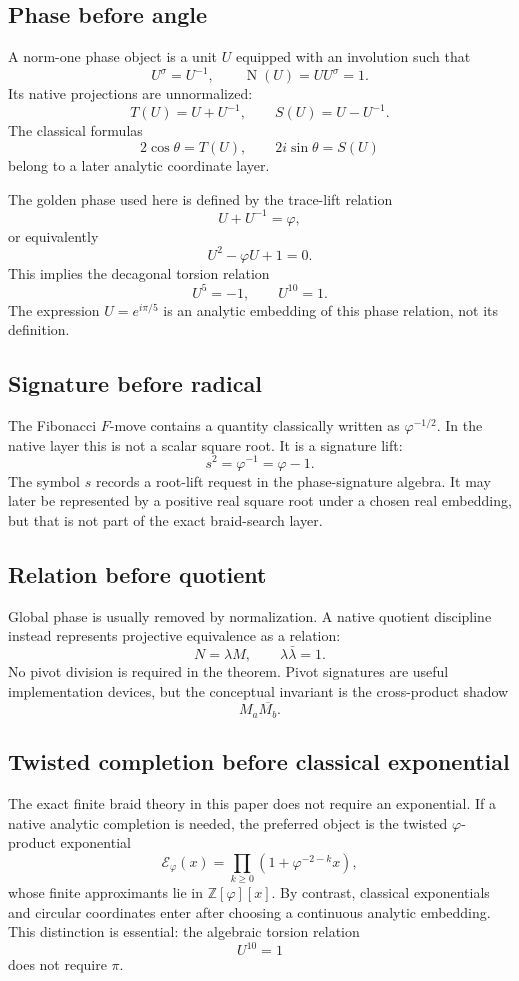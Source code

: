 \documentclass[11pt]{article}
\newcommand{\ph}{\varphi}
\newcommand{\Z}{\mathbb Z}
\newcommand{\Nm}{\operatorname{N}}
\newcommand{\sig}{\sigma}
\newcommand{\Etw}{\mathcal E_{\ph}}
\begin{document}
\subsection{Phase before angle}

A norm-one phase object is a unit $U$ equipped with an involution such that
\[
    U^\sig=U^{-1},
    \qquad
    \Nm(U)=UU^\sig=1.
\]
Its native projections are unnormalized:
\[
    T(U)=U+U^{-1},
    \qquad
    S(U)=U-U^{-1}.
\]
The classical formulas
\[
    2\cos\theta=T(U),
    \qquad
    2i\sin\theta=S(U)
\]
belong to a later analytic coordinate layer.

The golden phase used here is defined by the trace-lift relation
\[
    U+U^{-1}=\ph,
\]
or equivalently
\[
    U^2-\ph U+1=0.
\]
This implies the decagonal torsion relation
\[
    U^5=-1,\qquad U^{10}=1.
\]
The expression $U=e^{i\pi/5}$ is an analytic embedding of this phase relation, not its definition.

\subsection{Signature before radical}

The Fibonacci $F$-move contains a quantity classically written as $\ph^{-1/2}$.  In the native layer this is not a scalar square root.  It is a signature lift:
\[
    s^2=\ph^{-1}=\ph-1.
\]
The symbol $s$ records a root-lift request in the phase-signature algebra.  It may later be represented by a positive real square root under a chosen real embedding, but that is not part of the exact braid-search layer.

\subsection{Relation before quotient}

Global phase is usually removed by normalization.  A native quotient discipline instead represents projective equivalence as a relation:
\[
    N=\lambda M,
    \qquad
    \lambda\bar\lambda=1.
\]
No pivot division is required in the theorem.  Pivot signatures are useful implementation devices, but the conceptual invariant is the cross-product shadow
\[
    M_a\overline{M_b}.
\]

\subsection{Twisted completion before classical exponential}

The exact finite braid theory in this paper does not require an exponential.  If a native analytic completion is needed, the preferred object is the twisted $\ph$-product exponential
\[
    \Etw(x)=\prod_{k\ge0}(1+\ph^{-2-k}x),
\]
whose finite approximants lie in $\Z[\ph][x]$.  By contrast, classical exponentials and circular coordinates enter after choosing a continuous analytic embedding.  This distinction is essential: the algebraic torsion relation
\[
    U^{10}=1
\]
does not require $\pi$.
\end{document}
